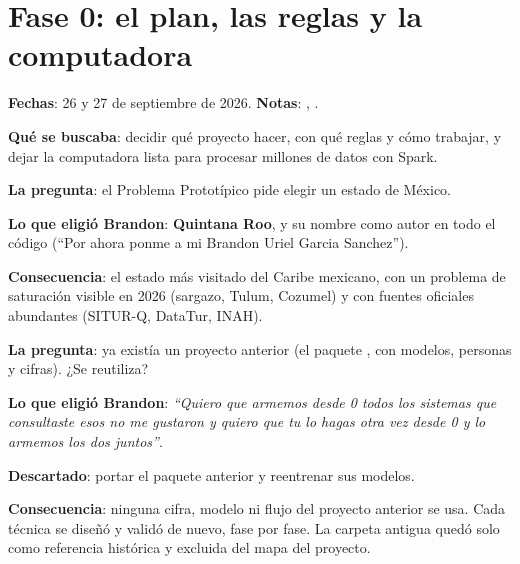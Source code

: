 \chapter{Fase 0: el plan, las reglas y la computadora}
\label{cap:d-f0}
\textbf{Fechas}: 26 y 27 de septiembre de 2026. \textbf{Notas}: , .

\textbf{Qué se buscaba}: decidir qué proyecto hacer, con qué reglas y cómo trabajar, y dejar la computadora lista para
procesar millones de datos con Spark.

\begin{opciones}
\textbf{La pregunta}: el Problema Prototípico pide elegir un estado de México.

\textbf{Lo que eligió Brandon}: \textbf{Quintana Roo}, y su nombre como autor en todo el código (``Por ahora ponme a mi
Brandon Uriel Garcia Sanchez'').

\textbf{Consecuencia}: el estado más visitado del Caribe mexicano, con un problema de saturación visible en 2026 (sargazo,
Tulum, Cozumel) y con fuentes oficiales abundantes (SITUR-Q, DataTur, INAH).
\end{opciones}

\begin{opciones}
\textbf{La pregunta}: ya existía un proyecto anterior (el paquete , con modelos, personas y cifras). ¿Se
reutiliza?

\textbf{Lo que eligió Brandon}: \emph{``Quiero que armemos desde 0 todos los sistemas que consultaste esos no me gustaron y
quiero que tu lo hagas otra vez desde 0 y lo armemos los dos juntos''}.

\textbf{Descartado}: portar el paquete anterior y reentrenar sus modelos.

\textbf{Consecuencia}: ninguna cifra, modelo ni flujo del proyecto anterior se usa. Cada técnica se diseñó y validó de
nuevo, fase por fase. La carpeta antigua quedó solo como referencia histórica y excluida del mapa del proyecto.
\end{opciones}

